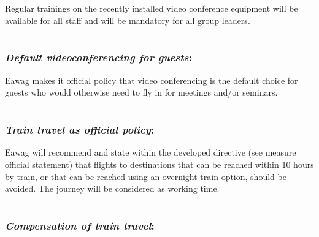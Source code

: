 \documentclass[]{tufte-handout}
\begin{document}
Regular trainings on the recently installed video conference equipment
will be available for all staff and will be mandatory for all group
leaders.

\hypertarget{video_default}{%
\section{}\label{video_default}}

\hypertarget{default-videoconferencing-for-guests}{%
\subsubsection{\texorpdfstring{\emph{Default videoconferencing for
guests}:}{Default videoconferencing for guests:}}\label{default-videoconferencing-for-guests}}

Eawag makes it official policy that video conferencing is the default
choice for guests who would otherwise need to fly in for meetings and/or
seminars.

\hypertarget{train_travel_policy}{%
\section{}\label{train_travel_policy}}

\hypertarget{train-travel-as-official-policy}{%
\subsubsection{\texorpdfstring{\emph{Train travel as official
policy}:}{Train travel as official policy:}}\label{train-travel-as-official-policy}}

Eawag will recommend and state within the developed directive (see
measure official statement) that flights to destinations that can be
reached within 10 hours by train, or that can be reached using an
overnight train option, should be avoided. The journey will be
considered as working time.

\hypertarget{train_travel_compensate}{%
\section{}\label{train_travel_compensate}}

\hypertarget{compensation-of-train-travel}{%
\subsubsection{\texorpdfstring{\emph{Compensation of train
travel}:}{Compensation of train travel:}}\label{compensation-of-train-travel}}
\end{document}
